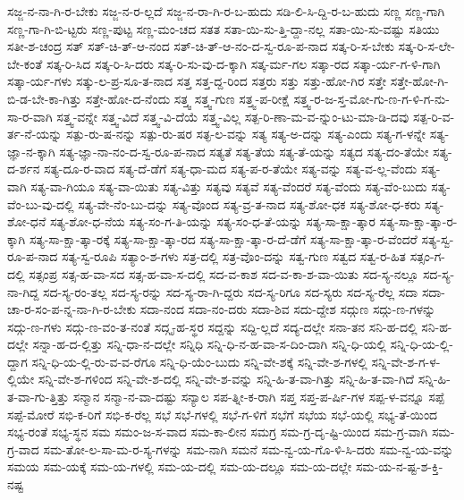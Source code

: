 {ಸಜ್ಜ-ನ-ನಾ-ಗಿ-ರ-ಬೇಕು
ಸಜ್ಜ-ನ-ರ-ಲ್ಲದೆ
ಸಜ್ಜ-ನ-ರಾ-ಗಿ-ರ-ಬ-ಹುದು
ಸಡಿ-ಲಿ-ಸಿ-ದ್ದಿ-ರ-ಬ-ಹುದು
ಸಣ್ಣ
ಸಣ್ಣ-ಗಾಗಿ
ಸಣ್ಣ-ಗಾ-ಗಿ-ಬಿ-ಟ್ಟರು
ಸಣ್ಣ-ಪುಟ್ಟ
ಸಣ್ಣ-ಮಂ-ಚದ
ಸತತ
ಸತಾ-ಯಿ-ಸು-ತ್ತಿ-ದ್ದಾ-ನಲ್ಲ
ಸತಾ-ಯಿ-ಸು-ವಷ್ಟು
ಸತಿಯು
ಸತೀ-ಶ-ಚಂದ್ರ
ಸತ್
ಸತ್-ಚಿ-ತ್-ಆ-ನಂದ
ಸತ್-ಚಿ-ತ್-ಆ-ನಂ-ದ-ಸ್ವ-ರೂ-ಪ-ನಾದ
ಸತ್ಕ-ರಿ-ಸ-ಬೇಕು
ಸತ್ಕ-ರಿ-ಸ-ಲೇ-ಬೇ-ಕಂತೆ
ಸತ್ಕ-ರಿ-ಸಿದ
ಸತ್ಕ-ರಿ-ಸಿ-ದರು
ಸತ್ಕ-ರಿ-ಸು-ವು-ದ-ಕ್ಕಾಗಿ
ಸತ್ಕ-ರ್ಮ-ಗಲ
ಸತ್ಕಾ-ರದ
ಸತ್ಕಾ-ರ್ಯ-ಗ-ಳಿ-ಗಾಗಿ
ಸತ್ಕಾ-ರ್ಯ-ಗಳು
ಸತ್ಕು-ಲ-ಪ್ರ-ಸೂ-ತ-ನಾದ
ಸತ್ತ
ಸತ್ತ-ದ್ದ-ರಿಂದ
ಸತ್ತರು
ಸತ್ತು
ಸತ್ತು-ಹೋ-ಗಿರ
ಸತ್ತೇ
ಸತ್ತೇ-ಹೋ-ಗಿ-ಬಿ-ಡ-ಬೇ-ಕಾ-ಗಿತ್ತು
ಸತ್ತೇ-ಹೋ-ದ-ನೆಂದು
ಸತ್ತ್ವ
ಸತ್ತ್ವ-ಗುಣ
ಸತ್ತ್ವ-ಪ-ರೀಕ್ಷೆ
ಸತ್ತ್ವ-ರ-ಜ-ಸ್ತ-ಮೋ-ಗು-ಣ-ಗ-ಳಿ-ಗ-ನು-ಸಾ-ರ-ವಾಗಿ
ಸತ್ತ್ವ-ವನ್ನೇ
ಸತ್ತ್ವ-ವಿದೆ
ಸತ್ತ್ವ-ವಿ-ದೆಯೆ
ಸತ್ತ್ವ-ವಿಲ್ಲ
ಸತ್ಪ-ರಿ-ಣಾ-ಮ-ವ-ನ್ನುಂ-ಟು-ಮಾ-ಡಿ-ದವು
ಸತ್ಪ-ರಿ-ವ-ರ್ತ-ನೆ-ಯನ್ನು
ಸತ್ಪು-ರು-ಷ-ನನ್ನು
ಸತ್ಪು-ರು-ಷರ
ಸತ್ಫ-ಲ-ವನ್ನು
ಸತ್ಯ
ಸತ್ಯ-ಅ-ದನ್ನು
ಸತ್ಯ-ಎಂದು
ಸತ್ಯ-ಗ-ಳನ್ನೇ
ಸತ್ಯ-ಜ್ಞಾ-ನ-ಕ್ಕಾಗಿ
ಸತ್ಯ-ಜ್ಞಾ-ನಾ-ನಂ-ದ-ಸ್ವ-ರೂ-ಪ-ನಾದ
ಸತ್ಯತೆ
ಸತ್ಯ-ತೆಯ
ಸತ್ಯ-ತೆ-ಯನ್ನು
ಸತ್ಯದ
ಸತ್ಯ-ದಂ-ತೆಯೇ
ಸತ್ಯ-ದ-ರ್ಶನ
ಸತ್ಯ-ದೂ-ರ-ವಾದ
ಸತ್ಯ-ದೆ-ಡೆಗೆ
ಸತ್ಯ-ಧಾ-ಮದ
ಸತ್ಯ-ಪ-ರ-ತೆಯೇ
ಸತ್ಯ-ವನ್ನು
ಸತ್ಯ-ವ-ಲ್ಲ-ವೆಂದು
ಸತ್ಯ-ವಾಗಿ
ಸತ್ಯ-ವಾ-ಗಿಯೂ
ಸತ್ಯ-ವಾ-ಯಿತು
ಸತ್ಯ-ವಿತ್ತು
ಸತ್ಯವು
ಸತ್ಯವೆ
ಸತ್ಯ-ವೆಂದರೆ
ಸತ್ಯ-ವೆಂದು
ಸತ್ಯ-ವೆಂ-ಬುದು
ಸತ್ಯ-ವೆಂ-ಬು-ವು-ದಲ್ಲಿ
ಸತ್ಯ-ವೇ-ನೆಂ-ಬು-ದನ್ನು
ಸತ್ಯ-ವೊಂದ
ಸತ್ಯ-ವ್ರ-ತ-ನಾದ
ಸತ್ಯ-ಶೋ-ಧಕ
ಸತ್ಯ-ಶೋ-ಧ-ಕರು
ಸತ್ಯ-ಶೋ-ಧನೆ
ಸತ್ಯ-ಶೋ-ಧ-ನೆಯ
ಸತ್ಯ-ಸಂ-ಗ-ತಿ-ಯನ್ನು
ಸತ್ಯ-ಸಂ-ಧ-ತೆ-ಯನ್ನು
ಸತ್ಯ-ಸಾ-ಕ್ಷಾ-ತ್ಕಾರ
ಸತ್ಯ-ಸಾ-ಕ್ಷಾ-ತ್ಕಾ-ರ-ಕ್ಕಾಗಿ
ಸತ್ಯ-ಸಾ-ಕ್ಷಾ-ತ್ಕಾ-ರಕ್ಕೆ
ಸತ್ಯ-ಸಾ-ಕ್ಷಾ-ತ್ಕಾ-ರದ
ಸತ್ಯ-ಸಾ-ಕ್ಷಾ-ತ್ಕಾ-ರ-ದೆ-ಡೆಗೆ
ಸತ್ಯ-ಸಾ-ಕ್ಷಾ-ತ್ಕಾ-ರ-ವೆಂದರೆ
ಸತ್ಯ-ಸ್ವ-ರೂ-ಪ-ನಾದ
ಸತ್ಯ-ಸ್ವ-ರೂಪಿ
ಸತ್ಯಾಂ-ಶ-ಗಳು
ಸತ್ರ-ದಲ್ಲಿ
ಸತ್ರ-ವೊಂ-ದನ್ನು
ಸತ್ವ-ಗುಣ
ಸತ್ವದ
ಸತ್ವ-ರ-ಹಿತ
ಸತ್ಸಂ-ಗ-ದಲ್ಲಿ
ಸತ್ಸಂಪ್ರ
ಸತ್ಸ-ಹ-ವಾ-ಸದ
ಸತ್ಸ-ಹ-ವಾ-ಸ-ದಲ್ಲಿ
ಸದ-ವ-ಕಾಶ
ಸದ-ವ-ಕಾ-ಶ-ವಾ-ಯಿತು
ಸದ-ಸ್ಯ-ನಲ್ಲೂ
ಸದ-ಸ್ಯ-ನಾ-ಗಿದ್ದ
ಸದ-ಸ್ಯ-ರಂ-ತಲ್ಲ
ಸದ-ಸ್ಯ-ರನ್ನು
ಸದ-ಸ್ಯ-ರಾ-ಗಿ-ದ್ದರು
ಸದ-ಸ್ಯ-ರಿಗೂ
ಸದ-ಸ್ಯರು
ಸದ-ಸ್ಯ-ರೆಲ್ಲ
ಸದಾ
ಸದಾ-ಚಾ-ರ-ಸಂ-ಪ-ನ್ನ-ನಾ-ಗಿ-ರ-ಬೇಕು
ಸದಾ-ನಂದ
ಸದಾ-ನಂ-ದರು
ಸದಾ-ಶಿವ
ಸದು-ದ್ದೇಶ
ಸದ್ಗುಣ
ಸದ್ಗು-ಣ-ಗಳನ್ನು
ಸದ್ಗು-ಣ-ಗಳು
ಸದ್ಗು-ಣ-ವಂ-ತ-ನಂತೆ
ಸದ್ಗೃ-ಹ-ಸ್ಥರ
ಸದ್ದನ್ನು
ಸದ್ದಿ-ಲ್ಲದೆ
ಸದ್ಯ-ದಲ್ಲೇ
ಸನಾ-ತನ
ಸನಿ-ಹ-ದಲ್ಲಿ
ಸನಿ-ಹ-ದಲ್ಲೇ
ಸನ್ನಾ-ಹ-ದ-ಲ್ಲಿತ್ತು
ಸನ್ನಿ-ಧಾ-ನ-ದಲ್ಲೇ
ಸನ್ನಿಧಿ
ಸನ್ನಿ-ಧಿ-ನ-ಹ-ವಾ-ಸ-ದಿಂ-ದಾಗಿ
ಸನ್ನಿ-ಧಿ-ಯಲ್ಲಿ
ಸನ್ನಿ-ಧಿ-ಯ-ಲ್ಲಿ-ದ್ದಾಗ
ಸನ್ನಿ-ಧಿ-ಯ-ಲ್ಲಿ-ರು-ವ-ವ-ರೆಗೂ
ಸನ್ನಿ-ಧಿ-ಯೆಂ-ಬುದು
ಸನ್ನಿ-ವೇ-ಶಕ್ಕೆ
ಸನ್ನಿ-ವೇ-ಶ-ಗಳಲ್ಲಿ
ಸನ್ನಿ-ವೇ-ಶ-ಗ-ಳ-ಲ್ಲಿಯೇ
ಸನ್ನಿ-ವೇ-ಶ-ಗಳಿಂದ
ಸನ್ನಿ-ವೇ-ಶ-ದಲ್ಲಿ
ಸನ್ನಿ-ವೇ-ಶ-ವನ್ನು
ಸನ್ನಿ-ಹಿ-ತ-ವಾ-ಗಿತ್ತು
ಸನ್ನಿ-ಹಿ-ತ-ವಾ-ಗಿದೆ
ಸನ್ನಿ-ಹಿ-ತ-ವಾ-ಗು-ತ್ತಿತ್ತು
ಸನ್ಮಾನ
ಸನ್ಮಾ-ನ-ವಾ-ದಷ್ಟು
ಸನ್ಯಾಲ
ಸಪ-ತ್ನೀ-ಕ-ರಾಗಿ
ಸಪ್ತ
ಸಪ್ತ-ಪ-ರ್ಷಿ-ಗಳ
ಸಪ್ಪ-ಳ-ವನ್ನೂ
ಸಪ್ಪೆ
ಸಪ್ಪೆ-ಮೋರೆ
ಸಭಿ-ಕ-ರಿಗೆ
ಸಭಿ-ಕ-ರೆಲ್ಲ
ಸಭೆ
ಸಭೆ-ಗಳಲ್ಲಿ
ಸಭೆ-ಗ-ಳಿಗೆ
ಸಭೆಗೆ
ಸಭೆಯ
ಸಭೆ-ಯಲ್ಲಿ
ಸಭ್ಯ-ತೆ-ಯಿಂದ
ಸಭ್ಯ-ರಂತೆ
ಸಭ್ಯ-ಸ್ಥನ
ಸಮ
ಸಮಂ-ಜ-ಸ-ವಾದ
ಸಮ-ಕಾ-ಲೀನ
ಸಮಗ್ರ
ಸಮ-ಗ್ರ-ದೃ-ಷ್ಟಿ-ಯಿಂದ
ಸಮ-ಗ್ರ-ವಾಗಿ
ಸಮ-ಗ್ರ-ವಾದ
ಸಮ-ತೋ-ಲ-ಸಾ-ಮ-ರ-ಸ್ಯ-ಗಳನ್ನು
ಸಮ-ನಾಗಿ
ಸಮನೆ
ಸಮ-ನ್ವ-ಯ-ಗೊ-ಳಿ-ಸಿ-ದರು
ಸಮ-ನ್ವ-ಯ-ವನ್ನು
ಸಮಯ
ಸಮ-ಯಕ್ಕೆ
ಸಮ-ಯ-ಗಳಲ್ಲಿ
ಸಮ-ಯ-ದಲ್ಲಿ
ಸಮ-ಯ-ದಲ್ಲೂ
ಸಮ-ಯ-ದಲ್ಲೇ
ಸಮ-ಯ-ನ-ಷ್ಟ-ಶ-ಕ್ತಿ-ನಷ್ಟ
}
